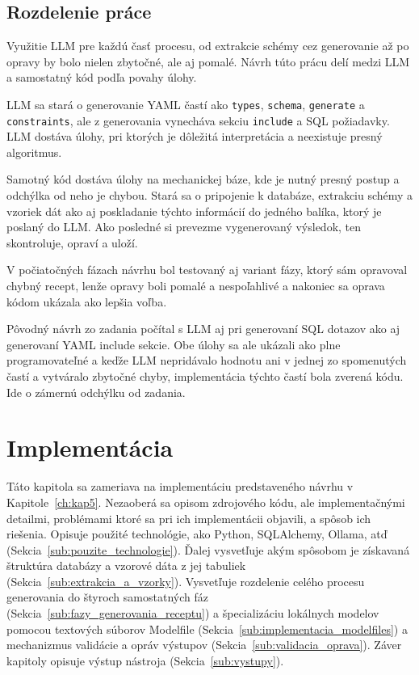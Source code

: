 \section{Rozdelenie práce}

\label{sub:rozdelenie_prace}

Využitie LLM pre každú časť procesu, od extrakcie schémy cez generovanie až po opravy by bolo nielen zbytočné, ale aj pomalé. Návrh túto prácu delí medzi LLM a samostatný kód podľa povahy úlohy. 


LLM sa stará o generovanie YAML častí ako \texttt{types}, \texttt{schema}, \texttt{generate} a \texttt{constraints}, ale z generovania vynecháva sekciu \texttt{include} a SQL požiadavky. LLM dostáva úlohy, pri ktorých je dôležitá interpretácia a neexistuje presný algoritmus.


Samotný kód dostáva úlohy na mechanickej báze, kde je nutný presný postup a odchýlka od neho je chybou. Stará sa o pripojenie k databáze, extrakciu schémy a vzoriek dát ako aj poskladanie týchto informácií do jedného balíka, ktorý je poslaný do LLM. Ako posledné si prevezme vygenerovaný výsledok, ten skontroluje, opraví a uloží. 


V počiatočných fázach návrhu bol testovaný aj variant fázy, ktorý sám opravoval chybný recept, lenže opravy boli pomalé a nespoľahlivé a nakoniec sa oprava kódom ukázala ako lepšia voľba. 


Pôvodný návrh zo zadania počítal s LLM aj pri generovaní SQL dotazov ako aj generovaní YAML include sekcie. Obe úlohy sa ale ukázali ako plne programovateľné a keďže LLM nepridávalo hodnotu ani v jednej zo spomenutých častí a vytváralo zbytočné chyby, implementácia týchto častí bola zverená kódu. Ide o zámernú odchýlku od zadania.



\chapter{Implementácia}
\label{ch:kap6}
Táto kapitola sa zameriava na implementáciu predstaveného návrhu v Kapitole~\ref{ch:kap5}. Nezaoberá sa  opisom zdrojového kódu, ale implementačnými detailmi, problémami ktoré sa pri ich implementácii objavili, a spôsob ich riešenia. Opisuje použité technológie, ako Python, SQLAlchemy, Ollama, atď (Sekcia~\ref{sub:pouzite_technologie}).  Ďalej vysvetľuje akým spôsobom je získavaná štruktúra databázy a vzorové dáta z jej tabuliek (Sekcia~\ref{sub:extrakcia_a_vzorky}). Vysvetľuje rozdelenie celého procesu generovania do štyroch samostatných fáz (Sekcia~\ref{sub:fazy_generovania_receptu}) a špecializáciu lokálnych modelov pomocou textových súborov Modelfile (Sekcia~\ref{sub:implementacia_modelfiles}) a mechanizmus validácie a opráv výstupov (Sekcia~\ref{sub:validacia_oprava}). Záver kapitoly opisuje výstup nástroja (Sekcia~\ref{sub:vystupy}).

